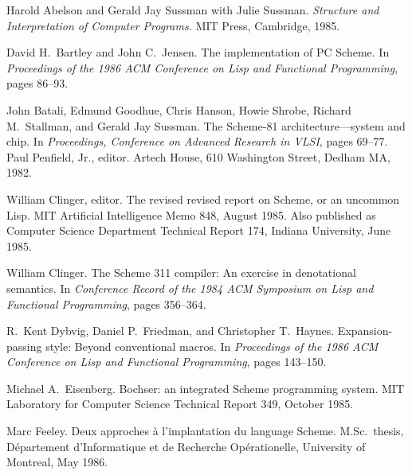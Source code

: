 



\begin{thebibliography}{99}

Harold Abelson and Gerald Jay Sussman with Julie Sussman.
{\em Structure and Interpretation of Computer Programs.}
MIT Press, Cambridge, 1985.

David H.~Bartley and John C.~Jensen.
The implementation of PC Scheme.
In {\em Proceedings of the 1986 ACM Conference on Lisp
  and Functional Programming}, pages 86--93.

John Batali, Edmund Goodhue, Chris Hanson, Howie Shrobe, Richard
  M.~Stallman, and Gerald Jay Sussman.
The Scheme-81 architecture---system and chip.
In {\em Proceedings, Conference on Advanced Research in VLSI},
  pages 69--77.
Paul Penfield, Jr., editor.
Artech House, 610 Washington Street, Dedham MA, 1982.


William Clinger, editor.
The revised revised report on Scheme, or an uncommon Lisp.
MIT Artificial Intelligence Memo 848, August 1985.
Also published as Computer Science Department Technical Report 174,
  Indiana University, June 1985.

William Clinger.
The Scheme 311 compiler: An exercise in denotational semantics.
In {\em Conference Record of the 1984 ACM Symposium on Lisp and
  Functional Programming}, pages 356--364.

R.~Kent Dybvig, Daniel P.~Friedman, and Christopher T.~Haynes.
Expansion-passing style: Beyond conventional macros.
In {\em Proceedings of the 1986 ACM Conference on Lisp and
  Functional Programming}, pages 143--150.

Michael A.~Eisenberg.
Bochser: an integrated Scheme programming system.
MIT Laboratory for Computer Science Technical Report 349,
  October 1985.

Marc Feeley.
Deux approches \`{a} l'implantation du language Scheme.
M.Sc.~thesis, D\'{e}partement d'Informatique et de Recherche
  Op\'{e}rationelle, University of Montreal, May 1986.


\end{thebibliography}
